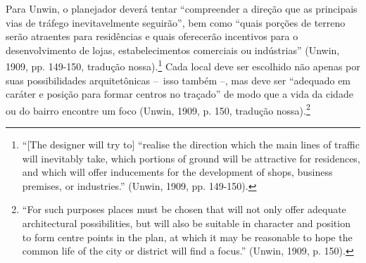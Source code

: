 \documentclass[12pt, a4paper]{book} %
\begin{document}
        Para Unwin, o planejador deverá tentar ``compreender a direção que as principais vias de tráfego inevitavelmente seguirão'', bem como ``quais porções de terreno serão atraentes para residências e quais oferecerão incentivos para o desenvolvimento de lojas, estabelecimentos comerciais ou indústrias'' (Unwin, 1909, pp. 149-150, tradução nossa).\footnote[39]{``[The designer will try to] ``realise the direction which the main lines of traffic will inevitably take, which portions of ground will be attractive for residences, and which will offer inducements for the development of shops, business premises, or industries.'' (Unwin, 1909, pp. 149-150).} Cada local deve ser escolhido não apenas por suas possibilidades arquitetônicas – isso também –, mas deve ser ``adequado em caráter e posição para formar centros no traçado'' de modo que a vida da cidade ou do bairro encontre um foco (Unwin, 1909, p. 150, tradução nossa).\footnote[40]{``For such purposes places must be chosen that will not only offer adequate architectural possibilities, but will also be suitable in character and position to form centre points in the plan, at which it may be reasonable to hope the common life of the city or district will find a focus.'' (Unwin, 1909, p. 150).}  
\end{document}
